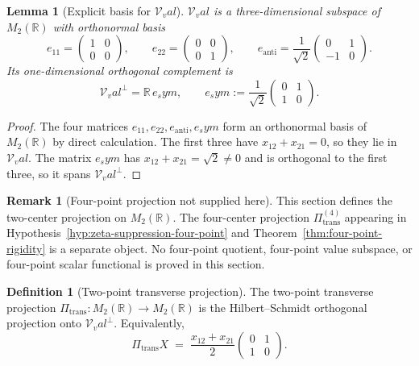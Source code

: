 \documentclass[11pt,a4paper]{amsart}
\def\val{val}%
\def\sym{sym}%
\numberwithin{equation}{section}
\theoremstyle{plain}
\newtheorem{lemma}[theorem]{Lemma}
\theoremstyle{definition}
\newtheorem{definition}[theorem]{Definition}
\newtheorem{remark}[theorem]{Remark}
\newcommand{\sym}{\mathrm{sym}}
\newcommand{\val}{\mathrm{val}}
\newcommand{\trans}{\mathrm{trans}}
\begin{document}
\begin{lemma}[Explicit basis for \(\mathcal V_\val\)]
\label{lem:value-subspace-explicit-basis}
\(\mathcal V_\val\) is a three-dimensional subspace of
\(M_2(\mathbb R)\) with orthonormal basis
\begin{equation}
\label{eq:V-val-basis}
        e_{11}=\begin{pmatrix}1&0\\0&0\end{pmatrix},
        \qquad
        e_{22}=\begin{pmatrix}0&0\\0&1\end{pmatrix},
        \qquad
        e_{\mathrm{anti}}=\frac1{\sqrt2}
        \begin{pmatrix}0&1\\-1&0\end{pmatrix}.
\end{equation}
Its one-dimensional orthogonal complement is
\begin{equation}
\label{eq:V-val-perp-basis}
        \mathcal V_\val^\perp=\mathbb R\,e_\sym,
        \qquad
        e_\sym:=\frac1{\sqrt2}
        \begin{pmatrix}0&1\\1&0\end{pmatrix}.
\end{equation}
\end{lemma}

\begin{proof}
The four matrices \(e_{11},e_{22},e_{\mathrm{anti}},e_\sym\) form an
orthonormal basis of \(M_2(\mathbb R)\) by direct calculation.  The
first three have \(x_{12}+x_{21}=0\), so they lie in
\(\mathcal V_\val\).  The matrix \(e_\sym\) has
\(x_{12}+x_{21}=\sqrt2\ne 0\) and is orthogonal to the first three, so
it spans \(\mathcal V_\val^\perp\).
\end{proof}

\begin{remark}[Four-point projection not supplied here]
\label{rem:transverse-projection-four-point-not-supplied}
This section defines the two-center projection on \(M_2(\mathbb R)\).
The four-center projection \(\Pi_\trans^{(4)}\) appearing in
Hypothesis~\ref{hyp:zeta-suppression-four-point} and
Theorem~\ref{thm:four-point-rigidity} is a separate object.  No
four-point quotient, four-point value subspace, or four-point scalar
functional is proved in this section.
\end{remark}

\begin{definition}[Two-point transverse projection]
\label{def:two-point-transverse-projection}
The two-point transverse projection
\(\Pi_\trans:M_2(\mathbb R)\to M_2(\mathbb R)\) is the
Hilbert--Schmidt orthogonal projection onto
\(\mathcal V_\val^\perp\).  Equivalently,
\begin{equation}
\label{eq:Pi-trans-explicit}
        \Pi_\trans X
        \;=\;\frac{x_{12}+x_{21}}{2}
        \begin{pmatrix}0&1\\1&0\end{pmatrix}.
\end{equation}
\end{definition}
\end{document}
